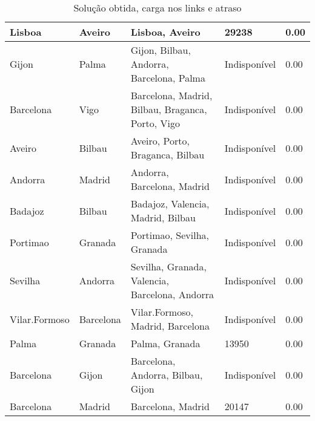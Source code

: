 \begin{table}[!htb]
{\begin{tabular}{|l|l|l|l|l|}
Lisboa & Aveiro & Lisboa, Aveiro & 29238 & 0.00 \\ \hline
Gijon & Palma & Gijon, Bilbau, Andorra, Barcelona, Palma & Indisponível & 0.00 \\ \hline
Barcelona & Vigo & Barcelona, Madrid, Bilbau, Braganca, Porto, Vigo & Indisponível & 0.00 \\ \hline
Aveiro & Bilbau & Aveiro, Porto, Braganca, Bilbau & Indisponível & 0.00 \\ \hline
Andorra & Madrid & Andorra, Barcelona, Madrid & Indisponível & 0.00 \\ \hline
Badajoz & Bilbau & Badajoz, Valencia, Madrid, Bilbau & Indisponível & 0.00 \\ \hline
Portimao & Granada & Portimao, Sevilha, Granada & Indisponível & 0.00 \\ \hline
Sevilha & Andorra & Sevilha, Granada, Valencia, Barcelona, Andorra & Indisponível & 0.00 \\ \hline
Vilar.Formoso & Barcelona & Vilar.Formoso, Madrid, Barcelona & Indisponível & 0.00 \\ \hline
Palma & Granada & Palma, Granada & 13950 & 0.00 \\ \hline
Barcelona & Gijon & Barcelona, Andorra, Bilbau, Gijon & Indisponível & 0.00 \\ \hline
Barcelona & Madrid & Barcelona, Madrid & 20147 & 0.00 \\ \hline
\end{tabular}}
\caption[]{Solução obtida, carga nos links e atraso}
\end{table}

